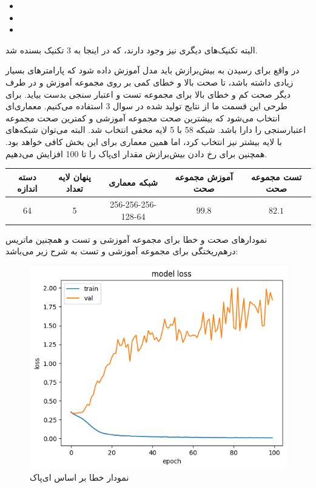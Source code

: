 \documentclass{article}
\begin{document}
\begin{itemize}
    \item {}
    \item {}
    \item {}
\end{itemize}

البته تکنیک‌های دیگری نیز وجود دارند، که در اینجا به 3 تکنیک بسنده شد.

در واقع برای رسیدن به بیش‌برازش باید مدل آموزش داده شود که پارامتر‌های بسیار زیادی داشته باشد، تا صحت بالا و خطای کمی بر روی مجموعه آموزش و در طرف دیگر صحت کم و خطای بالا برای مجموعه تست و اعتبار سنجی بدست بیاید. برای طرحی این قسمت ما از نتایج تولید شده در سوال 3 استفاده می‌کنیم. معماری‌ای انتخاب می‌شود که بیشترین صحت مجموعه آموزشی و کمترین صحت مجموعه اعتبارسنجی را دارا باشد. شبکه 58 با 5 لایه مخفی انتخاب شد. البته می‌توان شبکه‌های با لایه بیشتر نیز انتخاب کرد، اما همین معماری برای این بخش کافی خواهد بود. همچنین برای رخ دادن بیش‌برازش مقدار ای‌پاک را تا 100 افزایش می‌دهیم.

\begin{longtable}{|c|c|c|c|c|}
    \hline
    دسته اندازه& پنهان لایه تعداد & شبکه معماری & آموزش مجموعه صحت & تست مجموعه صحت \\ \hline
    64 & 5 & 256-256-256-128-64  & $99.8$ & $82.1$ \\ \hline
\end{longtable}

نمودارهای صحت و خطا برای مجموعه آموزشی و تست و همچنین ماتریس درهم‌ریختگی برای مجموعه آموزشی و تست به شرح زیر می‌باشد:

\begin{figure}[!h]
    \centering\includegraphics[scale=.55]{./p6-1}
    \caption{نمودار خطا بر اساس ای‌پاک}\label{fig.61}
\end{figure}
\end{document}
